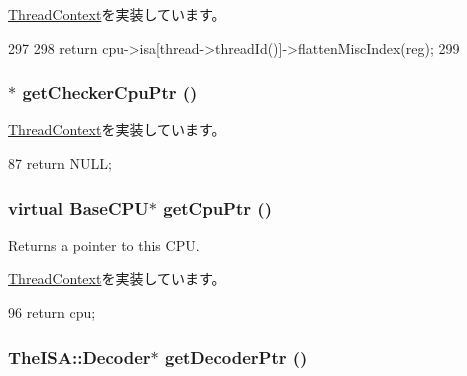 \hyperlink{classThreadContext_a8014f007a20a06d35f8b13adc3a05816}{ThreadContext}を実装しています。


\begin{DoxyCode}
297 {
298     return cpu->isa[thread->threadId()]->flattenMiscIndex(reg);
299 }
\end{DoxyCode}
\hypertarget{classO3ThreadContext_a0807ebbe39e158fdf6007ca00e3f7252}{
\subsubsection[{getCheckerCpuPtr}]{$\ast$ getCheckerCpuPtr ()}}
\label{classO3ThreadContext_a0807ebbe39e158fdf6007ca00e3f7252}


\hyperlink{classThreadContext_a78c10882b34a6238eac936f6913f9918}{ThreadContext}を実装しています。


\begin{DoxyCode}
87 { return NULL; }
\end{DoxyCode}
\hypertarget{classO3ThreadContext_ad44672c1d449c22e612a0d29a64891e6}{
\subsubsection[{getCpuPtr}]{\setlength{\rightskip}{0pt plus 5cm}virtual {\bf BaseCPU}$\ast$ getCpuPtr ()}}
\label{classO3ThreadContext_ad44672c1d449c22e612a0d29a64891e6}
Returns a pointer to this CPU. 

\hyperlink{classThreadContext_ad10a7ef049c2d2ffadfc809341e66d4e}{ThreadContext}を実装しています。


\begin{DoxyCode}
96 { return cpu; }
\end{DoxyCode}
\hypertarget{classO3ThreadContext_a6ae33963bc5f8b515f0a50c483f21c7f}{
\subsubsection[{getDecoderPtr}]{\setlength{\rightskip}{0pt plus 5cm}TheISA::Decoder$\ast$ getDecoderPtr ()}}
\label{classO3ThreadContext_a6ae33963bc5f8b515f0a50c483f21c7f}


